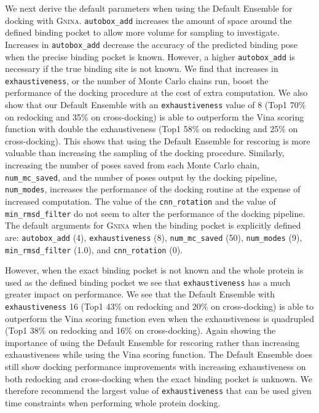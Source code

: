 \documentclass[journal=jcisd8,manuscript=article]{achemso}
\begin{document}
We next derive the default parameters when using the Default Ensemble for docking with \textsc{Gnina}. \texttt{autobox\_add} increases the amount of space around the defined binding pocket to allow more volume for sampling to investigate. Increases in \texttt{autobox\_add} decrease the accuracy of the predicted binding pose when the precise binding pocket is known. However, a higher \texttt{autobox\_add} is necessary if the true binding site is not  known. We find that increases in \texttt{exhaustiveness}, or the number of Monte Carlo chains run, boost the performance of the docking procedure at the cost of extra computation. We also show that our Default Ensemble with an \texttt{exhaustiveness} value of 8 (Top1 70\% on redocking and 35\% on cross-docking) is able to outperform the Vina scoring function with double the exhaustiveness (Top1 58\% on redocking and 25\% on cross-docking). This shows that using the Default Ensemble for rescoring is more valuable than increasing the sampling of the docking procedure. Similarly, increasing the number of poses saved from each Monte Carlo chain, \texttt{num\_mc\_saved}, and the number of poses output by the docking pipeline, \texttt{num\_modes}, increases the performance of the docking routine at the expense of increased computation. The value of the \texttt{cnn\_rotation} and the value of \texttt{min\_rmsd\_filter} do not seem to alter the performance of the docking pipeline. The default arguments for \textsc{Gnina} when the binding pocket is explicitly defined are: \texttt{autobox\_add} (4), \texttt{exhaustiveness} (8), \texttt{num\_mc\_saved} (50), \texttt{num\_modes} (9), \texttt{min\_rmsd\_filter} (1.0), and \texttt{cnn\_rotation} (0). 

However, when the exact binding pocket is not known and the whole protein is used as the defined binding pocket we see that \texttt{exhaustiveness} has a much greater impact on performance. We see that the Default Ensemble with \texttt{exhaustiveness} 16 (Top1 43\% on redocking and 20\% on cross-docking) is able to outperform the Vina scoring function even when the exhaustiveness is quadrupled (Top1 38\% on redocking and 16\% on cross-docking). Again showing the importance of using the Default Ensemble for rescoring rather than increasing exhaustiveness while using the Vina scoring function. The Default Ensemble does still show docking performance improvements with increasing exhaustiveness on both redocking and cross-docking when the exact binding pocket is unknown. We therefore recommend the largest value of \texttt{exhaustiveness} that can be used given time constraints when performing whole protein docking.
\end{document}
